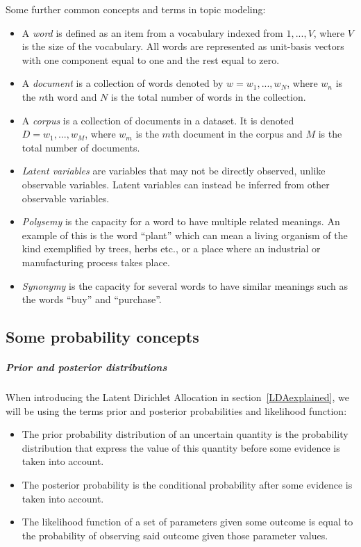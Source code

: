 \documentclass[12pt]{report}
\begin{document}
Some further common concepts and terms in topic modeling: 
\begin{itemize}
\item[] A \textit{word} is defined as an item from a vocabulary
  indexed from ${1, ..., V}$, where $V$ is the size of the
  vocabulary. All words are represented as unit-basis vectors with one
  component equal to one and the rest equal to zero.
\item[] A \textit{document} is a collection of words denoted by
  $w = {w_1, ..., w_N}$, where $w_n$ is the $n$th word and $N$ is the
  total number of words in the collection.
\item[] A \textit{corpus} is a collection of documents in a dataset.
  It is denoted $D = {w_1,..., w_M}$, where $w_m$ is the $m$th
  document in the corpus and $M$ is the total number of documents.
\item[] \textit{Latent variables} are variables that may not be directly observed, 
unlike observable variables. Latent variables can instead be inferred 
from other observable variables.
\item[] \textit{Polysemy} is the capacity for a word to have multiple related meanings. 
An example of this is the word “plant” which can mean a living organism of 
the kind exemplified by trees, herbs etc., or a place where an industrial or
manufacturing process takes place.
\item[] \textit{Synonymy} is the capacity for several words to have similar meanings such as the words “buy” and “purchase”.
\end{itemize}

\subsection{Some probability concepts}

\subparagraph{Prior and posterior distributions}

When introducing the Latent Dirichlet Allocation in section~\ref{LDAexplained}, 
we will be using the terms prior and posterior probabilities
and likelihood function:

\begin{itemize}
\item The prior probability distribution of an uncertain
  quantity is the probability distribution that express the value of
  this quantity before some evidence is taken into account.
\item The posterior probability is the conditional probability after some 
evidence is taken into account.
\item The likelihood function of a set of parameters given some outcome 
is equal to the probability of observing said outcome given those 
parameter values.
\end{itemize}
\end{document}
